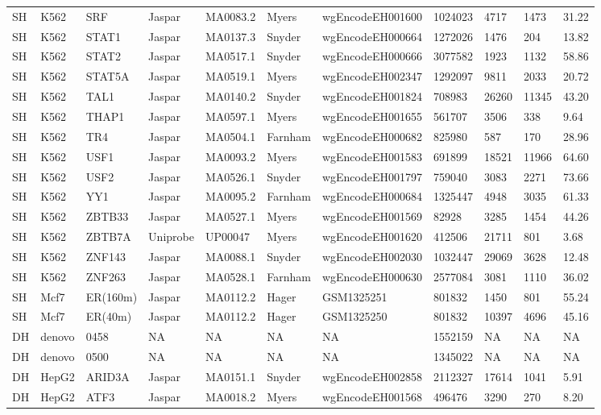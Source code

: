 {\begin{longtable}{p{0.2cm}p{1.1cm}p{1.0cm}p{1.0cm}p{1.0cm}p{1.0cm}p{2.3cm}p{1.0cm}p{0.8cm}p{0.8cm}p{0.8cm}}
SH & K562 & SRF & Jaspar & MA0083.2 & Myers & wgEncodeEH001600 & 1024023 & 4717 & 1473 & 31.22\\
SH & K562 & STAT1 & Jaspar & MA0137.3 & Snyder & wgEncodeEH000664 & 1272026 & 1476 & 204 & 13.82\\
SH & K562 & STAT2 & Jaspar & MA0517.1 & Snyder & wgEncodeEH000666 & 3077582 & 1923 & 1132 & 58.86\\
SH & K562 & STAT5A & Jaspar & MA0519.1 & Myers & wgEncodeEH002347 & 1292097 & 9811 & 2033 & 20.72\\
SH & K562 & TAL1 & Jaspar & MA0140.2 & Snyder & wgEncodeEH001824 & 708983 & 26260 & 11345 & 43.20\\
SH & K562 & THAP1 & Jaspar & MA0597.1 & Myers & wgEncodeEH001655 & 561707 & 3506 & 338 & 9.64\\
SH & K562 & TR4 & Jaspar & MA0504.1 & Farnham & wgEncodeEH000682 & 825980 & 587 & 170 & 28.96\\
SH & K562 & USF1 & Jaspar & MA0093.2 & Myers & wgEncodeEH001583 & 691899 & 18521 & 11966 & 64.60\\
SH & K562 & USF2 & Jaspar & MA0526.1 & Snyder & wgEncodeEH001797 & 759040 & 3083 & 2271 & 73.66\\
SH & K562 & YY1 & Jaspar & MA0095.2 & Farnham & wgEncodeEH000684 & 1325447 & 4948 & 3035 & 61.33\\
SH & K562 & ZBTB33 & Jaspar & MA0527.1 & Myers & wgEncodeEH001569 & 82928 & 3285 & 1454 & 44.26\\
SH & K562 & ZBTB7A & Uniprobe & UP00047 & Myers & wgEncodeEH001620 & 412506 & 21711 & 801 & 3.68\\
SH & K562 & ZNF143 & Jaspar & MA0088.1 & Snyder & wgEncodeEH002030 & 1032447 & 29069 & 3628 & 12.48\\
SH & K562 & ZNF263 & Jaspar & MA0528.1 & Farnham & wgEncodeEH000630 & 2577084 & 3081 & 1110 & 36.02\\
SH & Mcf7 & ER(160m) & Jaspar & MA0112.2 & Hager & GSM1325251 & 801832 & 1450 & 801 & 55.24\\
SH & Mcf7 & ER(40m) & Jaspar & MA0112.2 & Hager & GSM1325250 & 801832 & 10397 & 4696 & 45.16\\
DH & denovo & 0458 & NA & NA & NA & NA & 1552159 & NA & NA & NA\\
DH & denovo & 0500 & NA & NA & NA & NA & 1345022 & NA & NA & NA\\
DH & HepG2 & ARID3A & Jaspar & MA0151.1 & Snyder & wgEncodeEH002858 & 2112327 & 17614 & 1041 & 5.91\\
DH & HepG2 & ATF3 & Jaspar & MA0018.2 & Myers & wgEncodeEH001568 & 496476 & 3290 & 270 & 8.20\\

\end{longtable}}
